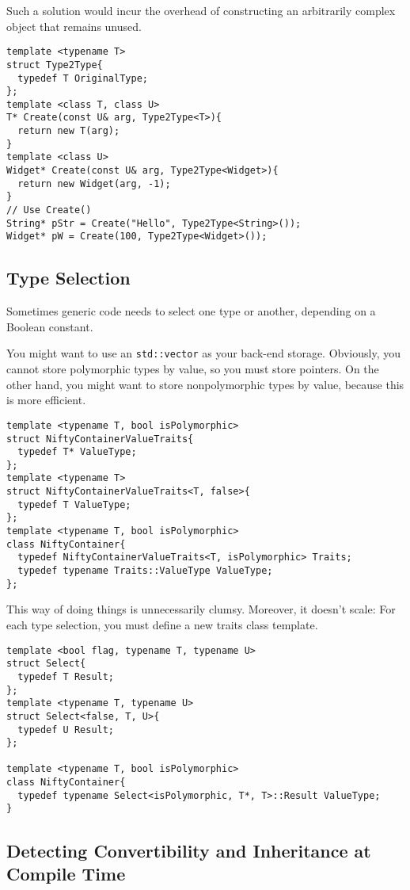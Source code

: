 Such a solution would incur the overhead of constructing an
arbitrarily complex object that remains unused.

\begin{verbatim}
template <typename T>
struct Type2Type{
  typedef T OriginalType;
};
template <class T, class U>
T* Create(const U& arg, Type2Type<T>){
  return new T(arg);
}
template <class U>
Widget* Create(const U& arg, Type2Type<Widget>){
  return new Widget(arg, -1);
}
// Use Create()
String* pStr = Create("Hello", Type2Type<String>());
Widget* pW = Create(100, Type2Type<Widget>());
\end{verbatim}

\subsection{Type Selection}

Sometimes generic code needs to select one type or another, depending
on a Boolean constant.

You might want to use an \texttt{std::vector} as your back-end
storage. Obviously, you cannot store polymorphic types by value, so
you must store pointers. On the other hand, you might want to store
nonpolymorphic types by value, because this is more efficient.

\begin{verbatim}
template <typename T, bool isPolymorphic>
struct NiftyContainerValueTraits{
  typedef T* ValueType;
};
template <typename T>
struct NiftyContainerValueTraits<T, false>{
  typedef T ValueType;
};
template <typename T, bool isPolymorphic>
class NiftyContainer{
  typedef NiftyContainerValueTraits<T, isPolymorphic> Traits;
  typedef typename Traits::ValueType ValueType;
};
\end{verbatim}

This way of doing things is unnecessarily clumsy. Moreover, it doesn't
scale: For each type selection, you must define a new traits class
template.

\begin{verbatim}
template <bool flag, typename T, typename U>
struct Select{
  typedef T Result;
};
template <typename T, typename U>
struct Select<false, T, U>{
  typedef U Result;
};

template <typename T, bool isPolymorphic>
class NiftyContainer{
  typedef typename Select<isPolymorphic, T*, T>::Result ValueType;
}
\end{verbatim}

\subsection{Detecting Convertibility and Inheritance at Compile Time}

